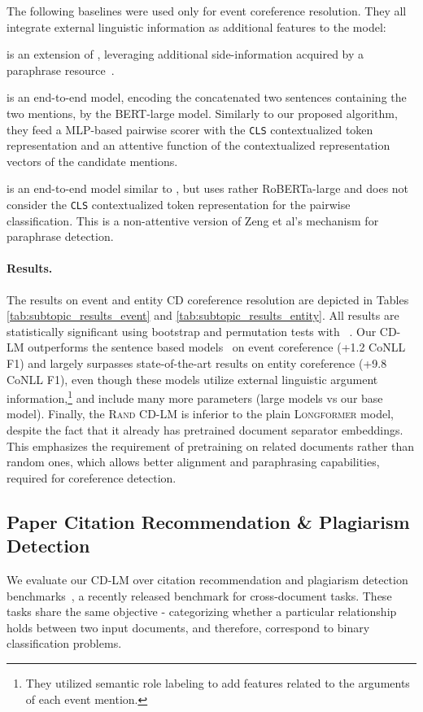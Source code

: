 \documentclass[11pt,a4paper]{article}
\begin{document}
\noindent The following baselines were used only for event coreference resolution. They all integrate external linguistic information as additional features to the model:

{\citet{meged-etal-2020-paraphrasing}} is an extension of \citet{barhom-etal-2019-revisiting}, leveraging additional side-information acquired by a  paraphrase resource~\cite{shwartz-etal-2017-acquiring}.

{\citet{zeng-etal-2020-event}} is an end-to-end model, encoding the concatenated two sentences containing the two mentions, by the BERT-large model. Similarly to our proposed algorithm, they feed a MLP-based pairwise scorer with the {\tt CLS} contextualized token representation and an attentive function of the contextualized representation vectors of the candidate mentions.

{\citet{yu2020paired}} is an end-to-end model similar to \citet{zeng-etal-2020-event}, but uses rather RoBERTa-large and does not consider the {\tt CLS} contextualized token representation for the pairwise classification. This is a non-attentive version of Zeng et al's mechanism  for paraphrase detection.

\paragraph{Results.} The results on event and entity CD coreference resolution are depicted in Tables \ref{tab:subtopic_results_event} and \ref{tab:subtopic_results_entity}. All results are statistically significant using bootstrap and permutation tests with ~\cite{dror-etal-2018-hitchhikers}. 
Our CD-LM outperforms the sentence based models~\cite{zeng-etal-2020-event,yu2020paired} on event coreference (+1.2 CoNLL F1) and largely surpasses state-of-the-art results on entity coreference (+9.8 CoNLL F1), even though these models utilize external linguistic argument information,\footnote{They utilized semantic role labeling to add features related to the  arguments of each event mention.} and include many more parameters (large models vs our base model). 
Finally, the \textsc{Rand CD-LM} is inferior to the plain \textsc{Longformer} model, despite the fact that it already has pretrained document separator embeddings. This emphasizes the requirement of pretraining on related documents rather than random ones, which allows better alignment and paraphrasing capabilities, required for coreference detection.

 \subsection{Paper Citation Recommendation \& Plagiarism Detection}
\label{subsec:aan}
We evaluate our CD-LM over citation recommendation and plagiarism detection benchmarks~\citet{zhou-etal-2020-multilevel}, a recently released benchmark for cross-document tasks. These tasks share the same objective - categorizing whether a particular relationship holds between two input documents, and therefore, correspond to binary classification problems.
\end{document}
